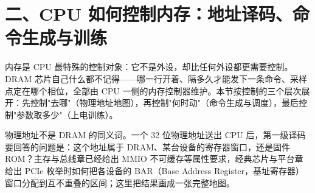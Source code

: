 \section{二、CPU 如何控制内存：地址译码、命令生成与训练}

内存是 CPU 最特殊的控制对象：它不是外设，却比任何外设都更需要控制。DRAM 芯片自己什么都不记得——哪一行开着、隔多久才能发下一条命令、采样点定在哪个相位，全部由 CPU 一侧的内存控制器维护。本节按控制的三个层次展开：先控制"去哪"（物理地址地图），再控制"何时动"（命令生成与调度），最后控制"参数取多少"（上电训练）。


物理地址不是 DRAM 的同义词。一个 32 位物理地址送出 CPU 后，第一级译码要回答的问题是：这个地址属于 DRAM、某台设备的寄存器窗口，还是固件 ROM？主存与总线章已经给出 MMIO 不可缓存等属性要求，经典芯片与平台章给出 PCIe 枚举时如何把各设备的 BAR（Base Address Register，基址寄存器）窗口分配到互不重叠的区间；这里把结果画成一张完整地图。


